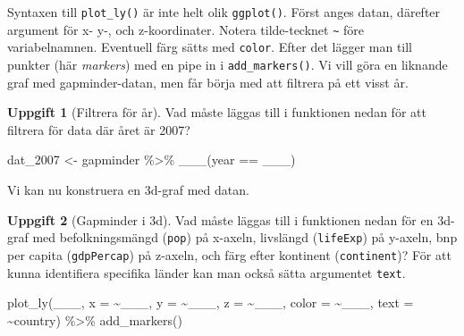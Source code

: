 \documentclass[
]{book}
\newenvironment{Shaded}{\begin{snugshade}}{\end{snugshade}}
\newcommand{\AttributeTok}[1]{\textcolor[rgb]{0.77,0.63,0.00}{#1}}
\newcommand{\FunctionTok}[1]{\textcolor[rgb]{0.00,0.00,0.00}{#1}}
\newcommand{\NormalTok}[1]{#1}
\newcommand{\OtherTok}[1]{\textcolor[rgb]{0.56,0.35,0.01}{#1}}
\newcommand{\SpecialCharTok}[1]{\textcolor[rgb]{0.00,0.00,0.00}{#1}}
\theoremstyle{definition}
\theoremstyle{definition}
\theoremstyle{definition}
\newtheorem{exercise}{Uppgift}[chapter]
\theoremstyle{definition}
\theoremstyle{remark}
\begin{document}
Syntaxen till \texttt{plot\_ly()} är inte helt olik \texttt{ggplot()}. Först anges datan, därefter argument för x- y-, och z-koordinater. Notera tilde-tecknet \texttt{\textasciitilde{}} före variabelnamnen. Eventuell färg sätts med \texttt{color}. Efter det lägger man till punkter (här \emph{markers}) med en pipe in i \texttt{add\_markers()}. Vi vill göra en liknande graf med gapminder-datan, men får börja med att filtrera på ett visst år.

\begin{exercise}[Filtrera för år]

Vad måste läggas till i funktionen nedan för att filtrera för data där året är 2007?

\begin{Shaded}
\begin{Highlighting}[]
\NormalTok{dat\_2007 }\OtherTok{\textless{}{-}}\NormalTok{ gapminder }\SpecialCharTok{\%\textgreater{}\%} 
  \FunctionTok{\_\_\_}\NormalTok{(year }\SpecialCharTok{==}\NormalTok{ \_\_\_)}
\end{Highlighting}
\end{Shaded}

\end{exercise}

Vi kan nu konstruera en 3d-graf med datan.

\begin{exercise}[Gapminder i 3d]

Vad måste läggas till i funktionen nedan för en 3d-graf med befolkningsmängd (\texttt{pop}) på x-axeln, livslängd (\texttt{lifeExp}) på y-axeln, bnp per capita (\texttt{gdpPercap}) på z-axeln, och färg efter kontinent (\texttt{continent})? För att kunna identifiera specifika länder kan man också sätta argumentet \texttt{text}.

\begin{Shaded}
\begin{Highlighting}[]
\FunctionTok{plot\_ly}\NormalTok{(\_\_\_, }\AttributeTok{x =} \SpecialCharTok{\textasciitilde{}}\NormalTok{\_\_\_, }\AttributeTok{y =} \SpecialCharTok{\textasciitilde{}}\NormalTok{\_\_\_, }\AttributeTok{z =} \SpecialCharTok{\textasciitilde{}}\NormalTok{\_\_\_, }\AttributeTok{color =} \SpecialCharTok{\textasciitilde{}}\NormalTok{\_\_\_, }\AttributeTok{text =} \SpecialCharTok{\textasciitilde{}}\NormalTok{country) }\SpecialCharTok{\%\textgreater{}\%} 
  \FunctionTok{add\_markers}\NormalTok{()}
\end{Highlighting}
\end{Shaded}

\end{exercise}
\end{document}
